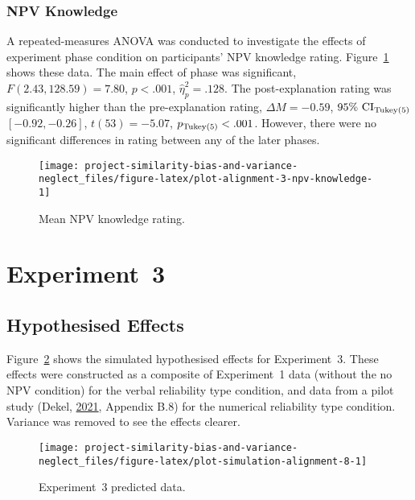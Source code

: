 \documentclass[
  english,
  man, donotrepeattitle,floatsintext]{apa7}
\theoremstyle{definition}
\theoremstyle{definition}
\theoremstyle{definition}
\theoremstyle{definition}
\theoremstyle{remark}
\begin{document}
\hypertarget{npv-knowledge}{%
\subsubsection{NPV Knowledge}\label{npv-knowledge}}

A repeated-measures ANOVA was conducted to investigate the effects of experiment
phase condition on participants' NPV knowledge rating.
Figure~\ref{fig:plot-alignment-3-npv-knowledge} shows these data. The main
effect of phase was significant, \(F(2.43, 128.59) = 7.80\), \(p < .001\), \(\hat{\eta}^2_p = .128\).
The post-explanation rating was significantly higher than the pre-explanation
rating,
\(\Delta M = -0.59\), \(95\%\ \mathrm{CI}_\mathrm{\scriptsize Tukey(5)}\) \([-0.92, -0.26]\), \(t(53) = -5.07\), \(p_\mathrm{\scriptsize Tukey(5)} < .001\). However, there were no significant
differences in rating between any of the later phases.



\begin{figure}
\texttt{[image: project-similarity-bias-and-variance-neglect\_files/figure-latex/plot-alignment-3-npv-knowledge-1]} \caption{Mean NPV knowledge rating.}\label{fig:plot-alignment-3-npv-knowledge}
\end{figure}

\hypertarget{experiment-3}{%
\section{Experiment~3}\label{experiment-3}}

\hypertarget{alignment-8-appendix}{%
\subsection{Hypothesised Effects}\label{alignment-8-appendix}}

Figure~\ref{fig:plot-simulation-alignment-8} shows the simulated hypothesised
effects for Experiment~3. These effects were constructed as a composite of
Experiment~1 data (without the no NPV condition) for the verbal reliability type
condition, and data from a pilot study (Dekel, \protect\hyperlink{ref-dekel2021b}{2021}, Appendix B.8) for the
numerical reliability type condition. Variance was removed to see the effects
clearer.



\begin{figure}
\texttt{[image: project-similarity-bias-and-variance-neglect\_files/figure-latex/plot-simulation-alignment-8-1]} \caption{Experiment~3 predicted data.}\label{fig:plot-simulation-alignment-8}
\end{figure}
\end{document}
